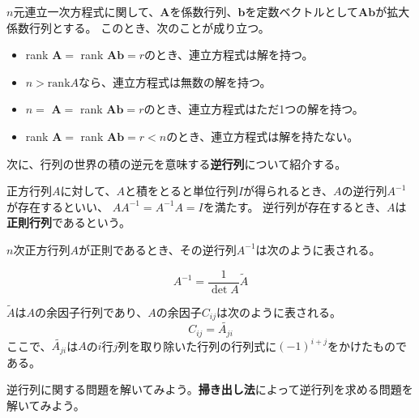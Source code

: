 \documentclass{jlreq}
\begin{document}
\begin{theorembox}[連立方程式と階数]
  $n$元連立一次方程式に関して、$\boldsymbol{A}$を係数行列、$\boldsymbol{b}$を定数ベクトルとして$\boldsymbol{A} \boldsymbol{b}$が拡大係数行列とする。
  このとき、次のことが成り立つ。
  
  \begin{itemize}
    \item rank $\boldsymbol{A} = $ rank $\boldsymbol{A} \boldsymbol{b} = r$のとき、連立方程式は解を持つ。
    \item $n > \text{rank} A$なら、連立方程式は無数の解を持つ。
    \item $n = $ $\boldsymbol{A} = $ rank $\boldsymbol{A} \boldsymbol{b} = r$のとき、連立方程式はただ1つの解を持つ。
    \item rank $\boldsymbol{A} = $ rank $\boldsymbol{A} \boldsymbol{b} = r < n$のとき、連立方程式は解を持たない。
  \end{itemize}
\end{theorembox}

次に、行列の世界の積の逆元を意味する\textbf{逆行列}について紹介する。

\begin{definitionbox}[逆行列]
  正方行列$A$に対して、$A$と積をとると単位行列$I$が得られるとき、$A$の逆行列$A^{-1}$が存在するといい、
  $A A^{-1} = A^{-1} A = I$を満たす。 逆行列が存在するとき、$A$は\textbf{正則行列}であるという。
\end{definitionbox}

\begin{theorembox}[逆行列と余因子行列]
  $n$次正方行列$A$が正則であるとき、その逆行列$A^{-1}$は次のように表される。
  
  \begin{equation*}
    A^{-1} = \frac{1}{\det A} \tilde{A}
  \end{equation*}

  $\tilde{A}$は$A$の余因子行列であり、$A$の余因子$C_{ij}$は次のように表される。
  \begin{equation*}
    C_{ij} = \tilde{A_{ji}}
  \end{equation*}
  ここで、$\tilde{A_{ji}}$は$A$の$i$行$j$列を取り除いた行列の行列式に$(-1)^{i+j}$をかけたものである。
\end{theorembox}

逆行列に関する問題を解いてみよう。\textbf{掃き出し法}によって逆行列を求める問題を解いてみよう。
\end{document}
